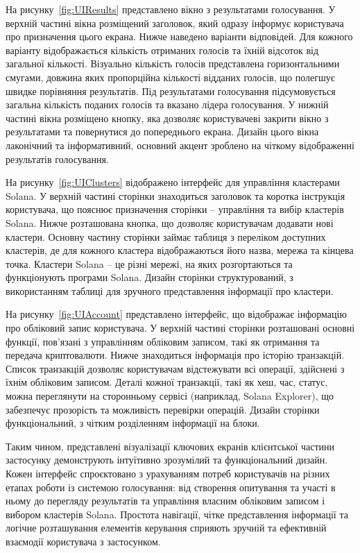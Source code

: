\documentclass[14pt]{extreport}
\begin{document}
  На рисунку~\ref{fig:UIResults} представлено вікно з результатами голосування. У верхній частині вікна розміщений заголовок, який одразу інформує користувача про призначення цього екрана. Нижче наведено варіанти відповідей. Для кожного варіанту відображається кількість отриманих голосів та їхній відсоток від загальної кількості. Візуально кількість голосів представлена горизонтальними смугами, довжина яких пропорційна кількості відданих голосів, що полегшує швидке порівняння результатів. Під результатами голосування підсумовується загальна кількість поданих голосів та вказано лідера голосування. У нижній частині вікна розміщено кнопку, яка дозволяє користувачеві закрити вікно з результатами та повернутися до попереднього екрана. Дизайн цього вікна лаконічний та інформативний, основний акцент зроблено на чіткому відображенні результатів голосування.

  На рисунку~\ref{fig:UIClusters} відображено інтерфейс для управління кластерами Solana. У верхній частині сторінки знаходиться заголовок та коротка інструкція користувача, що пояснює призначення сторінки – управління та вибір кластерів Solana. Нижче розташована кнопка, що дозволяє користувачам додавати нові кластери. Основну частину сторінки займає таблиця з переліком доступних кластерів, де для кожного кластера відображаються його назва, мережа та кінцева точка. Кластери Solana – це різні мережі, на яких розгортаються та функціонують програми Solana. Дизайн сторінки структурований, з використанням таблиці для зручного представлення інформації про кластери.

  На рисунку~\ref{fig:UIAccount} представлено інтерфейс, що відображає інформацію про обліковий запис користувача. У верхній частині сторінки розташовані основні функції, пов'язані з управлінням обліковим записом, такі як отримання та передача криптовалюти. Нижче знаходиться інформація про історію транзакцій. Список транзакцій дозволяє користувачам відстежувати всі операції, здійснені з їхнім обліковим записом. Деталі кожної транзакції, такі як хеш, час, статус, можна переглянути на сторонньому сервісі (наприклад, Solana Explorer), що забезпечує прозорість та можливість перевірки операцій. Дизайн сторінки функціональний, з чітким розділенням інформації на блоки.
    
  Таким чином, представлені візуалізації ключових екранів клієнтської частини застосунку демонструють інтуїтивно зрозумілий та функціональний дизайн. Кожен інтерфейс спроєктовано з урахуванням потреб користувачів на різних етапах роботи із системою голосування: від створення опитування та участі в ньому до перегляду результатів та управління власним обліковим записом і вибором кластерів Solana. Простота навігації, чітке представлення інформації та логічне розташування елементів керування сприяють зручній та ефективній взаємодії користувача з застосунком.
  
\end{document}
